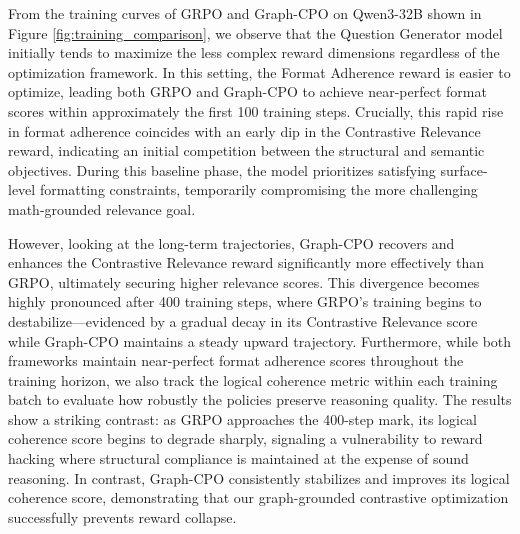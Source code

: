 \documentclass[sigconf, anonymous, review, screen]{acmart}
\begin{document}
From the training curves of GRPO and Graph-CPO on Qwen3-32B shown in Figure \ref{fig:training_comparison}, we observe that the Question Generator model initially tends to maximize the less complex reward dimensions regardless of the optimization framework. In this setting, the Format Adherence reward is easier to optimize, leading both GRPO and Graph-CPO to achieve near-perfect format scores within approximately the first 100 training steps. Crucially, this rapid rise in format adherence coincides with an early dip in the Contrastive Relevance reward, indicating an initial competition between the structural and semantic objectives. During this baseline phase, the model prioritizes satisfying surface-level formatting constraints, temporarily compromising the more challenging math-grounded relevance goal.


However, looking at the long-term trajectories, Graph-CPO recovers and enhances the Contrastive Relevance reward significantly more effectively than GRPO, ultimately securing higher relevance scores. This divergence becomes highly pronounced after 400 training steps, where GRPO's training begins to destabilize---evidenced by a gradual decay in its Contrastive Relevance score while Graph-CPO maintains a steady upward trajectory.
Furthermore, while both frameworks maintain near-perfect format adherence scores throughout the training horizon, we also track the logical coherence metric within each training batch to evaluate how robustly the policies preserve reasoning quality. The results show a striking contrast: as GRPO approaches the 400-step mark, its logical coherence score begins to degrade sharply, signaling a vulnerability to reward hacking where structural compliance is maintained at the expense of sound reasoning. In contrast, Graph-CPO consistently stabilizes and improves its logical coherence score, demonstrating that our graph-grounded contrastive optimization successfully prevents reward collapse.
\end{document}
